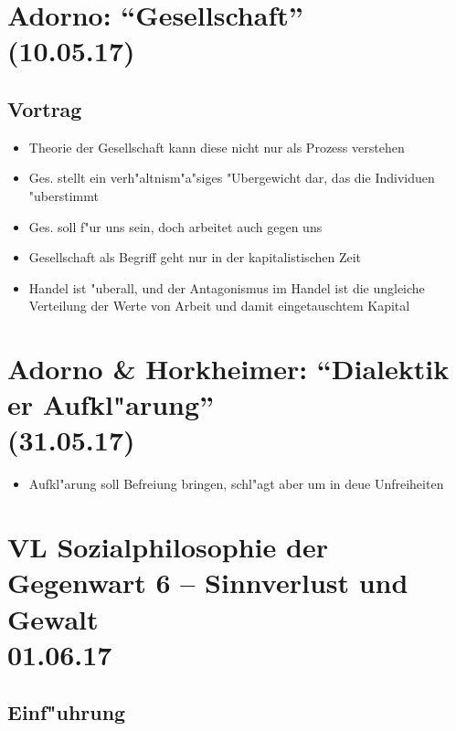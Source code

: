 \documentclass[emulatestandardclasses]{scrartcl}
\begin{document}
\section{Adorno: "`Gesellschaft"'
\\(10.05.17)}

\subsection{Vortrag}

\begin{itemize}
  \item Theorie der Gesellschaft kann diese nicht nur als Prozess verstehen
  \item Ges. stellt ein verh"altnism"a"siges "Ubergewicht dar, das die Individuen "uberstimmt
  \item Ges. soll f"ur uns sein, doch arbeitet auch gegen uns
  \item Gesellschaft als Begriff geht nur in der kapitalistischen Zeit
  \item Handel ist "uberall, und der Antagonismus im Handel ist die ungleiche Verteilung der Werte von Arbeit und damit eingetauschtem Kapital
\end{itemize}

\section{Adorno \& Horkheimer: "`Dialektik er Aufkl"arung"'
\\(31.05.17)}

\begin{itemize}
  \item Aufkl"arung soll Befreiung bringen, schl"agt aber um in deue Unfreiheiten
\end{itemize}


\section{VL Sozialphilosophie der Gegenwart 6 -- Sinnverlust und Gewalt\\01.06.17}

\subsection{Einf"uhrung}
\end{document}
